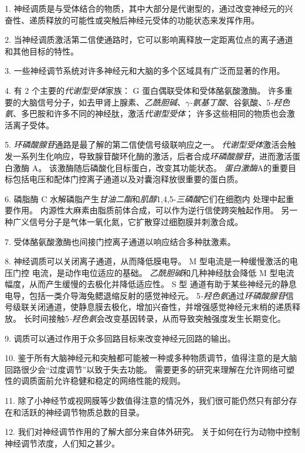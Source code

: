 1. 神经调质是与受体结合的物质，其中大部分是代谢型的，通过改变神经元的兴奋性、递质释放的可能性或突触后神经元受体的功能状态来发挥作用。


2. 当神经调质激活第二信使通路时，它可以影响离释放一定距离位点的离子通道和其他目标的特性。


3. 一些神经调节系统对许多神经元和大脑的多个区域具有广泛而显著的作用。


4. 有 2 个主要的\textit{代谢型受体}家族：
G 蛋白偶联受体和受体酪氨酸激酶。 
许多重要的大脑信号分子，如去甲肾上腺素、\textit{乙酰胆碱}、\textit{$\gamma$-氨基丁酸}、谷氨酸、5\textit{-羟色氨}、多巴胺和许多不同的神经肽，激活\textit{代谢型受体}；
许多这些相同的物质也会激活离子受体。 


5. \textit{环磷酸腺苷}通路是最了解的第二信使信号级联响应之一。
\textit{代谢型受体}激活会触发一系列生化响应，导致腺苷酸环化酶的激活，后者合成\textit{环磷酸腺苷}，进而激活蛋白激酶 A。
该激酶随后磷酸化目标蛋白，改变其功能状态。
\textit{蛋白激酶}A的重要目标包括电压和配体门控离子通道以及对囊泡释放很重要的蛋白质。 


6. 磷脂酶 C 水解磷脂产生\textit{甘油二酯}和\textit{肌醇}1,4,5-\textit{三磷酸}它们在细胞内  处理中起重要作用。
内源性大麻素由脂质前体合成，可以作为逆行信使跨突触起作用。
另一种广义信号分子是气体一氧化氮，它扩散穿过细胞膜并刺激合成。


7. 受体酪氨酸激酶也间接门控离子通道以响应结合多种肽激素。


8. 神经调质可以关闭离子通道，从而降低膜电导。
M 型电流是一种缓慢激活的电压门控  电流，是动作电位适应的基础。
\textit{乙酰胆碱}和几种神经肽会降低 M 型电流幅度，从而产生缓慢的去极化并降低适应性。
S 型  通道有助于某些神经元的静息  电导，包括一类介导海兔鳃退缩反射的感觉神经元。
5\textit{-羟色氨}通过\textit{环磷酸腺苷}信号级联关闭通道，使静息膜去极化，增加兴奋性，并增强感觉神经元末梢的递质释放。
长时间接触5\textit{-羟色氨}会改变基因转录，从而导致突触强度发生长期变化。 


9. 调质可以通过作用于众多回路目标来改变神经元回路的输出。 


10. 鉴于所有大脑神经元和突触都可能被一种或多种物质调节，值得注意的是大脑回路很少会“过度调节”以致于失去功能。
需要更多的研究来理解在允许网络可塑性的调质面前允许稳健和稳定的网络性能的规则。


11. 除了小神经节或视网膜等少数值得注意的情况外，我们很可能仍然只有部分存在和活跃的神经调节物质总数的目录。


12. 我们对神经调节作用的了解大部分来自体外研究。
关于如何在行为动物中控制神经调节浓度，人们知之甚少。





